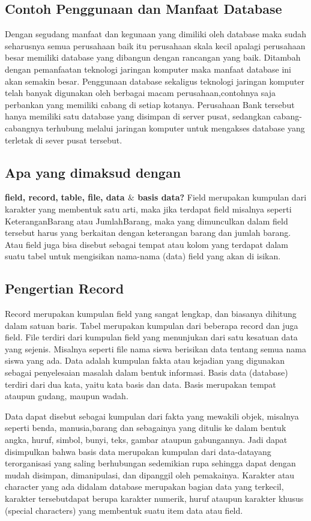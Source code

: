 \subsection{Contoh Penggunaan dan Manfaat Database} 
Dengan segudang manfaat dan kegunaan yang dimiliki oleh database maka sudah seharusnya semua perusahaan baik itu perusahaan skala kecil apalagi perusahaan besar memiliki database yang dibangun dengan rancangan yang baik. Ditambah dengan pemanfaatan teknologi jaringan komputer maka manfaat database ini akan semakin besar. Penggunaan database sekaligus teknologi jaringan komputer telah banyak digunakan oleh berbagai macam perusahaan,contohnya saja perbankan yang memiliki cabang di setiap kotanya. Perusahaan Bank tersebut hanya memiliki satu database yang disimpan di server pusat, sedangkan cabang-cabangnya terhubung melalui jaringan komputer untuk mengakses database yang terletak di sever pusat tersebut.

\noindent 
\subsection{Apa yang dimaksud dengan}\textbf{ field, record, }\textbf{table, file, data  $  \&  $ basis data?} 
Field merupakan kumpulan dari karakter yang membentuk satu arti, maka jika terdapat field misalnya seperti KeteranganBarang atau JumlahBarang, maka yang dimunculkan dalam field tersebut harus yang berkaitan dengan keterangan barang dan jumlah barang. Atau field juga bisa disebut sebagai tempat atau kolom yang terdapat dalam suatu tabel untuk mengisikan nama-nama (data) field yang akan di isikan.
\vspace{12pt}

\subsection{Pengertian Record}
Record merupakan kumpulan field yang sangat lengkap, dan biasanya dihitung dalam satuan baris. Tabel merupakan kumpulan dari beberapa record dan juga field. File terdiri dari kumpulan field yang menunjukan dari satu kesatuan data yang sejenis. Misalnya seperti file nama siswa berisikan data tentang semua nama siswa yang ada. Data adalah kumpulan fakta atau kejadian yang digunakan sebagai penyelesaian masalah dalam bentuk informasi. Basis data (database) terdiri dari dua kata, yaitu kata basis dan data. Basis merupakan tempat ataupun gudang, maupun wadah.

Data dapat disebut sebagai kumpulan dari fakta yang mewakili objek, misalnya seperti benda, manusia,barang dan sebagainya yang ditulis ke dalam bentuk angka, huruf, simbol, bunyi, teks, gambar ataupun gabungannya. Jadi dapat disimpulkan bahwa basis data merupakan kumpulan dari data-datayang terorganisasi yang saling berhubungan sedemikian rupa sehingga dapat dengan mudah disimpan, dimanipulasi, dan dipanggil oleh pemakainya. Karakter atau character yang ada didalam database merupakan bagian data yang terkecil, karakter tersebutdapat berupa karakter numerik, huruf ataupun karakter khusus (special characters) yang membentuk suatu item data atau field.
\vspace{12pt}
\noindent 

